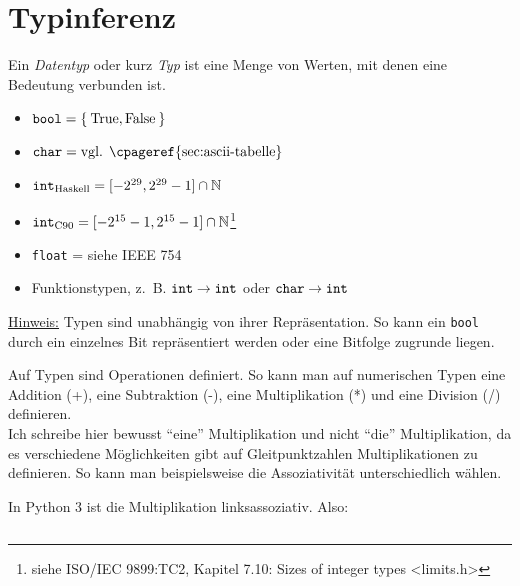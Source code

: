 \chapter{Typinferenz}
\begin{definition}[Datentyp]%
	Ein \textit{Datentyp} oder kurz \textit{Typ} ist eine Menge von Werten, mit
	denen eine Bedeutung verbunden ist.
\end{definition}

\begin{beispiel}[Datentypen]
	\begin{itemize}
		\item $\text{\texttt{bool}} = \Set{\text{True}, \text{False}}$
		\item $\text{\texttt{char}} = \text{vgl. \cpageref{sec:ascii-tabelle}}$
		\item $\text{\texttt{int}}_{\text{Haskell}} = [-2^{29}, 2^{29}-1] \cap \mathbb{N}$
		\item $\text{\texttt{int}}_{\text{C90}} = [-2^{15}-1, 2^{15}-1] \cap \mathbb{N}$\footnote{siehe ISO/IEC 9899:TC2, Kapitel 7.10: Sizes of integer types <limits.h>}
		\item \texttt{float} = siehe IEEE 754
		\item Funktionstypen, z.~B. $\text{\texttt{int}} \rightarrow \text{\texttt{int}}$ oder
			  $\text{\texttt{char}} \rightarrow \text{\texttt{int}}$
	\end{itemize}
\end{beispiel}

\underline{Hinweis:} Typen sind unabhängig von ihrer Repräsentation. So kann ein
\texttt{bool} durch ein einzelnes Bit repräsentiert werden oder eine Bitfolge
zugrunde liegen.

Auf Typen sind Operationen definiert. So kann man auf numerischen Typen eine 
Addition (+), eine Subtraktion (-), eine Multiplikation (*) und eine Division (/)
definieren.\\
Ich schreibe hier bewusst \enquote{eine} Multiplikation und nicht \enquote{die}
Multiplikation, da es verschiedene Möglichkeiten gibt auf Gleitpunktzahlen
Multiplikationen zu definieren. So kann man beispielsweise die Assoziativität
unterschiedlich wählen.

\begin{beispiel}
	In Python 3 ist die Multiplikation linksassoziativ. Also:
	\inputminted[numbersep=5pt, tabsize=4]{python}{scripts/python/multiplikation.py}
\end{beispiel}

